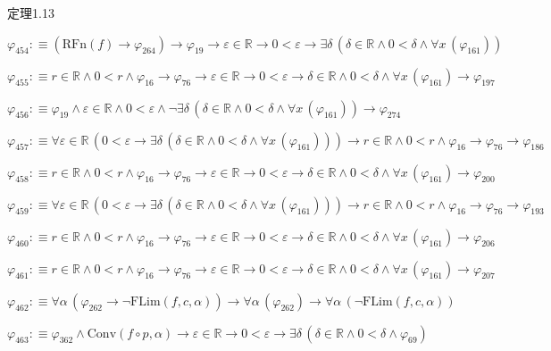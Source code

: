\begin{fullproof}{定理1.13}
\begin{abbrevlist}
\item $\varphi_{454} :\equiv (\mathrm{RFn}(f) \to \varphi_{264}) \to \varphi_{19} \to \varepsilon \in \mathbb{R} \to 0 < \varepsilon \to \exists \delta\,(\delta \in \mathbb{R} \land 0 < \delta \land \forall x\,(\varphi_{161}))$
\item $\varphi_{455} :\equiv r \in \mathbb{R} \land 0 < r \land \varphi_{16} \to \varphi_{76} \to \varepsilon \in \mathbb{R} \to 0 < \varepsilon \to \delta \in \mathbb{R} \land 0 < \delta \land \forall x\,(\varphi_{161}) \to \varphi_{197}$
\item $\varphi_{456} :\equiv \varphi_{19} \land \varepsilon \in \mathbb{R} \land 0 < \varepsilon \land \neg \exists \delta\,(\delta \in \mathbb{R} \land 0 < \delta \land \forall x\,(\varphi_{161})) \to \varphi_{274}$
\item $\varphi_{457} :\equiv \forall \varepsilon \in \mathbb{R}\,(0 < \varepsilon \to \exists \delta\,(\delta \in \mathbb{R} \land 0 < \delta \land \forall x\,(\varphi_{161}))) \to r \in \mathbb{R} \land 0 < r \land \varphi_{16} \to \varphi_{76} \to \varphi_{186}$
\item $\varphi_{458} :\equiv r \in \mathbb{R} \land 0 < r \land \varphi_{16} \to \varphi_{76} \to \varepsilon \in \mathbb{R} \to 0 < \varepsilon \to \delta \in \mathbb{R} \land 0 < \delta \land \forall x\,(\varphi_{161}) \to \varphi_{200}$
\item $\varphi_{459} :\equiv \forall \varepsilon \in \mathbb{R}\,(0 < \varepsilon \to \exists \delta\,(\delta \in \mathbb{R} \land 0 < \delta \land \forall x\,(\varphi_{161}))) \to r \in \mathbb{R} \land 0 < r \land \varphi_{16} \to \varphi_{76} \to \varphi_{193}$
\item $\varphi_{460} :\equiv r \in \mathbb{R} \land 0 < r \land \varphi_{16} \to \varphi_{76} \to \varepsilon \in \mathbb{R} \to 0 < \varepsilon \to \delta \in \mathbb{R} \land 0 < \delta \land \forall x\,(\varphi_{161}) \to \varphi_{206}$
\item $\varphi_{461} :\equiv r \in \mathbb{R} \land 0 < r \land \varphi_{16} \to \varphi_{76} \to \varepsilon \in \mathbb{R} \to 0 < \varepsilon \to \delta \in \mathbb{R} \land 0 < \delta \land \forall x\,(\varphi_{161}) \to \varphi_{207}$
\item $\varphi_{462} :\equiv \forall \alpha\,(\varphi_{262} \to \neg \mathrm{FLim}(f,c,\alpha)) \to \forall \alpha\,(\varphi_{262}) \to \forall \alpha\,(\neg \mathrm{FLim}(f,c,\alpha))$
\item $\varphi_{463} :\equiv \varphi_{362} \land \mathrm{Conv}(f \circ p,\alpha) \to \varepsilon \in \mathbb{R} \to 0 < \varepsilon \to \exists \delta\,(\delta \in \mathbb{R} \land 0 < \delta \land \varphi_{69})$

\end{abbrevlist}
\end{fullproof}
